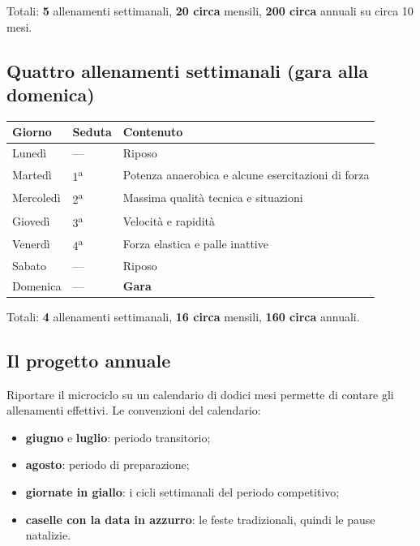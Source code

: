 Totali: \textbf{5} allenamenti settimanali, \textbf{20 circa} mensili, \textbf{200 circa} annuali su
circa 10 mesi.

\subsection{Quattro allenamenti settimanali (gara alla domenica)}

\begin{table}[htbp]
  \centering
  \small
  \renewcommand{\arraystretch}{1.3}
  \begin{tabularx}{\textwidth}{|l|l|X|}
    \hline
    \textbf{Giorno} & \textbf{Seduta} & \textbf{Contenuto} \\
    \hline
    Lunedì & --- & Riposo \\
    \hline
    Martedì & 1\textsuperscript{a} & Potenza anaerobica e alcune esercitazioni di forza \\
    \hline
    Mercoledì & 2\textsuperscript{a} & Massima qualità tecnica e situazioni \\
    \hline
    Giovedì & 3\textsuperscript{a} & Velocità e rapidità \\
    \hline
    Venerdì & 4\textsuperscript{a} & Forza elastica e palle inattive \\
    \hline
    Sabato & --- & Riposo \\
    \hline
    Domenica & --- & \textbf{Gara} \\
    \hline
  \end{tabularx}
\end{table}

Totali: \textbf{4} allenamenti settimanali, \textbf{16 circa} mensili, \textbf{160 circa} annuali.

\subsection{Il progetto annuale}

Riportare il microciclo su un calendario di dodici mesi permette di contare gli allenamenti
effettivi. Le convenzioni del calendario:

\begin{itemize}
  \item \textbf{giugno} e \textbf{luglio}: periodo transitorio;
  \item \textbf{agosto}: periodo di preparazione;
  \item \textbf{giornate in giallo}: i cicli settimanali del periodo competitivo;
  \item \textbf{caselle con la data in azzurro}: le feste tradizionali, quindi le pause natalizie.
\end{itemize}


